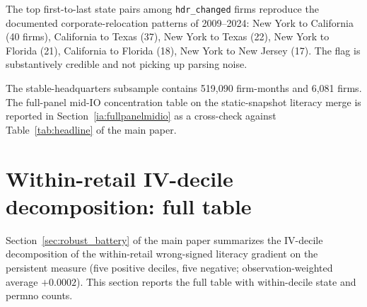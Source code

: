\documentclass[12pt]{article}
\begin{document}
The top first-to-last state pairs among \texttt{hdr\_changed} firms reproduce the documented corporate-relocation patterns of 2009--2024: New York to California (40 firms), California to Texas (37), New York to Texas (22), New York to Florida (21), California to Florida (18), New York to New Jersey (17). The flag is substantively credible and not picking up parsing noise.

The stable-headquarters subsample contains 519,090 firm-months and 6,081 firms. The full-panel mid-IO concentration table on the static-snapshot literacy merge is reported in Section~\ref{ia:fullpanelmidio} as a cross-check against Table~\ref{tab:headline} of the main paper.

\section{Within-retail IV-decile decomposition: full table}
\label{ia:ivdecile}

Section~\ref{sec:robust_battery} of the main paper summarizes the IV-decile decomposition of the within-retail wrong-signed literacy gradient on the persistent measure (five positive deciles, five negative; observation-weighted average $+0.0002$). This section reports the full table with within-decile state and permno counts.
\end{document}
